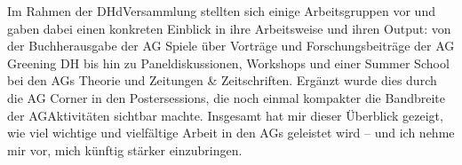 \documentclass[letterpaper,10pt,english]{jupyterBook}
\begin{document}
\sphinxAtStartPar
Im Rahmen der DHd\sphinxhyphen{}Versammlung stellten sich einige Arbeitsgruppen vor und gaben dabei einen konkreten Einblick in ihre Arbeitsweise und ihren Output: von der Buchherausgabe der AG Spiele über Vorträge und Forschungsbeiträge der AG Greening DH bis hin zu Paneldiskussionen, Workshops und einer Summer School bei den AGs Theorie und Zeitungen \& Zeitschriften. Ergänzt wurde dies durch die AG Corner in den Postersessions, die noch einmal kompakter die Bandbreite der AG\sphinxhyphen{}Aktivitäten sichtbar machte. Insgesamt hat mir dieser Überblick gezeigt, wie viel wichtige und vielfältige Arbeit in den AGs geleistet wird – und ich nehme mir vor, mich künftig stärker einzubringen.







\renewcommand{\indexname}{Index}
\printindex
\end{document}
